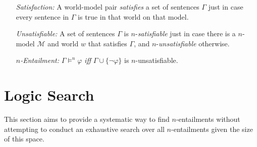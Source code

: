 \documentclass[a4paper, 11pt]{article} %
\newcommand{\set}[1]{\lbrace#1\rbrace} %
\newcommand{\M}[0]{\mathcal{M}}
\begin{document}
\begin{enumerate}
  \item[\it Satisfaction:] A world-model pair \textit{satisfies} a set of sentences $\Gamma$ just in case every sentence in $\Gamma$ is true in that world on that model.
  \item[\it Unsatisfiable:] A set of sentences $\Gamma$ is $n$-\textit{satisfiable} just in case there is a $n$-model $\M$ and world $w$ that satisfies $\Gamma$, and $n$-\textit{unsatisfiable} otherwise.
  \item[\it $n$-Entailment:] $\Gamma \vDash^n \varphi$ \textit{iff} $\Gamma\cup\set{\neg\varphi}$ is $n$-unsatisfiable. 
\end{enumerate}





\section{Logic Search}

This section aims to provide a systematic way to find $n$-entailments without attempting to conduct an exhaustive search over all $n$-entailments given the size of this space.



\end{document}
